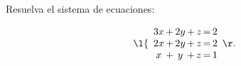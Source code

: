 \documentclass[compacto,10pt]{pubciencias-notas}
\begin{document}
\begin{ejer}
    Resuelva el sistema de ecuaciones:

     \[
        \l\{
        \begin{array}{c@{\,}c@{\,}c@{\,}c@{\,}c@{\,}c@{\,}c}
        3x  & + & 2y & + & z &= & 2 \\
        2x  & + & 2y & + & z &= & 2\\
        x  & + & y & + & z &= & 1
        \end{array}
        \r.
    \]


\end{ejer}
\end{document}
